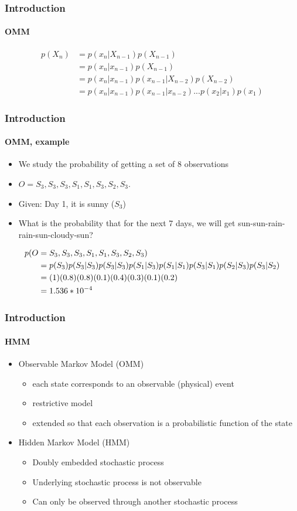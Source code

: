 \begin{frame}
\frametitle{Introduction}
\framesubtitle{OMM}
\logoCSIPCPL\mypagenum
	\begin{align*}
		p(X_n) 	&= p(x_n| X_{n-1})p(X_{n-1})   	  						\\
				&= p(x_n| x_{n-1}) p(X_{n-1})   							\\  
				&= p(x_n| x_{n-1}) p(x_{n-1}| X_{n-2})p(X_{n-2})  			\\	
				&= p(x_n| x_{n-1}) p(x_{n-1}| x_{n-2}) ... p(x_2|x_1)p(x_1)  	
	\end{align*}
\end{frame}




\begin{frame}
\frametitle{Introduction}
\framesubtitle{OMM, example}
\logoCSIPCPL\mypagenum
	\begin{itemize}
		\item We study the probability of getting a set of 8 observations
		\item $O={S_3, S_3, S_3, S_1, S_1, S_3, S_2, S_3}$.  
		\item Given: Day 1, it is sunny ($S_3$)
		\item What is the probability that for the next 7 days, we will get sun-sun-rain-rain-sun-cloudy-sun?  	
	\end{itemize}
	\begin{align*}
		\tiny
		p(O&={S_3, S_3, S_3, S_1, S_1, S_3, S_2, S_3}) \\
		&= p(S_3)p(S_3|S_3)p(S_3|S_3)p(S_1|S_3)p(S_1|S_1)p(S_3|S_1)p(S_2|S_3)p(S_3|S_2) \\
		&=(1)(0.8)(0.8)(0.1)(0.4)(0.3)(0.1)(0.2)  \\
		&=1.536*10^{-4} 
	\end{align*}
\end{frame}	




\begin{frame}
\frametitle{Introduction}
\framesubtitle{HMM}
\logoCSIPCPL\mypagenum
	\begin{itemize}
		\item {\color{red}Observable Markov Model (OMM)}
			\begin{itemize}
				\item each state corresponds to an observable (physical) event
				\item restrictive model
				\item extended so that each observation is a probabilistic function of the state
			\end{itemize}
		\item {\color{red}Hidden Markov Model (HMM)}
			\begin{itemize}
				\item Doubly embedded stochastic process
				\item Underlying stochastic process is not observable 
				\item Can only be observed through another  stochastic process
			\end{itemize}
	\end{itemize}
\end{frame}




